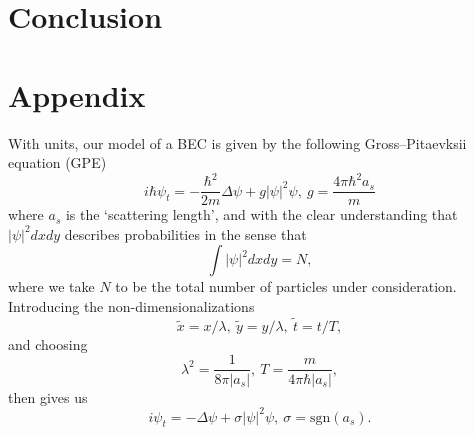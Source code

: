 \documentclass[a4paper,11pt]{article}
\begin{document}
\section*{Conclusion}

\section*{Appendix}
With units, our model of a BEC is given by the following Gross--Pitaevksii equation (GPE)
\[
i\hbar\psi_{t} = -\frac{\hbar^{2}}{2m}\Delta \psi + g\left| \psi\right|^{2}\psi, ~ g = \frac{4\pi \hbar^{2}a_{s}}{m}
\]
where $a_{s}$ is the `scattering length', and with the clear understanding that $\left|\psi\right|^{2}dxdy$ describes probabilities in the sense that 
\[
\int |\psi|^{2}dxdy = N,
\]
where we take $N$ to be the total number of particles under consideration.  Introducing the non-dimensionalizations 
\[
\tilde{x} = x/\lambda, ~ \tilde{y} = y/\lambda, ~ \tilde{t} = t/T, 
\]
and choosing
\[
\lambda^{2} = \frac{1}{8\pi |a_{s}|}, ~ T = \frac{m}{4\pi\hbar |a_{s}|}, 
\] 
then gives us
\[
i\psi_{t} = -\Delta \psi + \sigma\left| \psi\right|^{2}\psi,  ~\sigma = \mbox{sgn}(a_{s}).
\]



\end{document}
